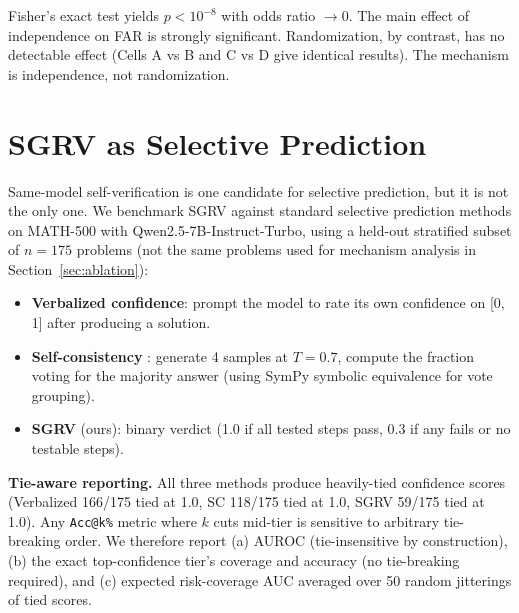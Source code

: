 \documentclass{article}
\begin{document}
Fisher's exact test yields $p < 10^{-8}$ with odds ratio $\to 0$. The main effect of independence on FAR is strongly significant. Randomization, by contrast, has no detectable effect (Cells A vs B and C vs D give identical results). The mechanism is independence, not randomization.

\section{SGRV as Selective Prediction}
\label{sec:selective}

Same-model self-verification is one candidate for selective prediction, but it is not the only one. We benchmark SGRV against standard selective prediction methods on MATH-500 with Qwen2.5-7B-Instruct-Turbo, using a held-out stratified subset of $n=175$ problems (not the same problems used for mechanism analysis in Section~\ref{sec:ablation}):

\begin{itemize}[leftmargin=*,itemsep=1pt]
\item \textbf{Verbalized confidence}: prompt the model to rate its own confidence on [0, 1] after producing a solution.
\item \textbf{Self-consistency} \citep{wang2023selfconsistency}: generate 4 samples at $T{=}0.7$, compute the fraction voting for the majority answer (using SymPy symbolic equivalence for vote grouping).
\item \textbf{SGRV} (ours): binary verdict (1.0 if all tested steps pass, 0.3 if any fails or no testable steps).
\end{itemize}

\textbf{Tie-aware reporting.} All three methods produce heavily-tied confidence scores (Verbalized 166/175 tied at 1.0, SC 118/175 tied at 1.0, SGRV 59/175 tied at 1.0). Any \texttt{Acc@k\%} metric where $k$ cuts mid-tier is sensitive to arbitrary tie-breaking order. We therefore report (a) AUROC (tie-insensitive by construction), (b) the exact top-confidence tier's coverage and accuracy (no tie-breaking required), and (c) expected risk-coverage AUC averaged over 50 random jitterings of tied scores.
\end{document}
